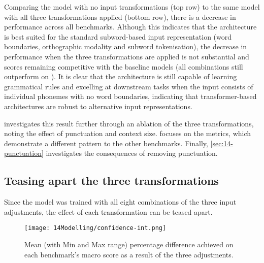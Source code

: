 Comparing the \gpt model with no input transformations (top row) to the same model with all three transformations applied (bottom row), there is a decrease in performance across all benchmarks. Although this indicates that the \gpt architecture is best suited for the standard subword-based input representation (word boundaries, orthographic modality and subword tokenisation), the decrease in performance when the three transformations are applied is not substantial and scores remaining competitive with the baseline models (all combinations still outperform  on \blimp). It is clear that the \gpt architecture is still capable of learning grammatical rules and excelling at downstream tasks when the input consists of individual phonemes with no word boundaries, indicating that transformer-based architectures are robust to alternative input representations.

 investigates this result further through an ablation of the three transformations, noting the effect of punctuation and context size.  focuses on the \babyslm metrics, which demonstrate a different pattern to the other benchmarks. Finally, \cref{sec:14-punctuation} investigates the consequences of removing punctuation.

\subsection{Teasing apart the three transformations}\label{sec:14-effect}

Since the \gpt model was trained with all eight combinations of the three input adjustments, the effect of each transformation can be teased apart.

\begin{figure}
    \centering
    \texttt{[image: 14Modelling/confidence-int.png]}
      \caption{Mean (with Min and Max range) percentage difference achieved on each benchmark's macro score as a result of the three adjustments.}
    \label{fig:14-condition-differences}
\end{figure}

